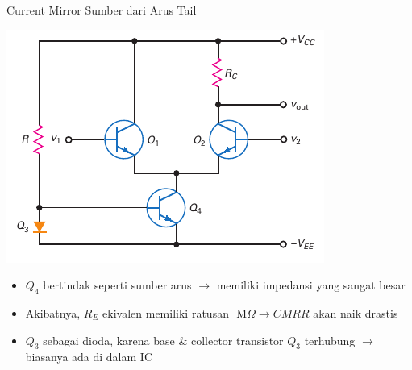 \documentclass[aspectratio=169]{beamer}
\begin{document}
\begin{frame}{Current Mirror Sumber dari Arus Tail}
	\begin{multicols}{2}
		\begin{center}
			\includegraphics[height=0.6\textheight]{gambar/01.fig29}
		\end{center}
		\columnbreak
		\begin{itemize}
			\item $ Q_4 $ bertindak seperti sumber arus $ \rightarrow $ memiliki impedansi yang sangat besar
			\item Akibatnya, $ R_E $ ekivalen memiliki ratusan $ \text{ M}\Omega \rightarrow CMRR $ akan naik drastis
			\item $ Q_3 $ sebagai dioda, karena base \& collector transistor $ Q_3 $ terhubung $ \rightarrow $ biasanya ada di dalam IC
		\end{itemize}
	\end{multicols}
\end{frame}
\end{document}
